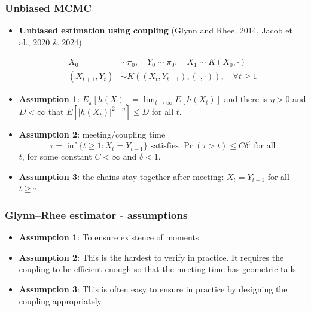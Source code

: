 \begin{frame}
	\frametitle{Unbiased MCMC}

	\begin{itemize}
		\item \textbf{Unbiased estimation using coupling} (Glynn and Rhee, 2014, Jacob et al., 2020 \& 2024)

		      \begin{align*}
			      X_0            & \sim \pi_0, \quad Y_0 \sim \pi_0, \quad X_1 \sim K(X_0, \cdot)       \\
			      (X_{t+1}, Y_t) & \sim \bar{K}((X_t, Y_{t-1}), (\cdot, \cdot)), \quad \forall t \geq 1
		      \end{align*}

		\item \textbf{Assumption 1}: $E_\pi[h(X)] = \lim_{t \to \infty} E[h(X_t)]$ and there is $\eta > 0$ and $D < \infty$ that $E[|h(X_t)|^{2+\eta}] \leq D$ for all $t$.

		\item \textbf{Assumption 2}: meeting/coupling time
		      \[
			      \tau = \inf\{t \geq 1 : X_t = Y_{t-1}\} \text{ satisfies } \Pr(\tau > t) \leq C\delta^t \text{ for all}
		      \]
		      $t$, for some constant $C < \infty$ and $\delta < 1$.

		\item \textbf{Assumption 3}: the chains stay together after meeting: $X_t = Y_{t-1}$ for all $t \geq \tau$.

	\end{itemize}

\end{frame}

\begin{frame}
	\frametitle{Glynn--Rhee estimator - assumptions}
	\begin{itemize}
		\item \textbf{Assumption 1}: To ensure existence of moments
		\item \textbf{Assumption 2}: This is the hardest to verify in practice. It requires the coupling to be efficient enough so that the meeting time has geometric tails
		\item \textbf{Assumption 3}: This is often easy to ensure in practice by designing the coupling appropriately
	\end{itemize}
\end{frame}


